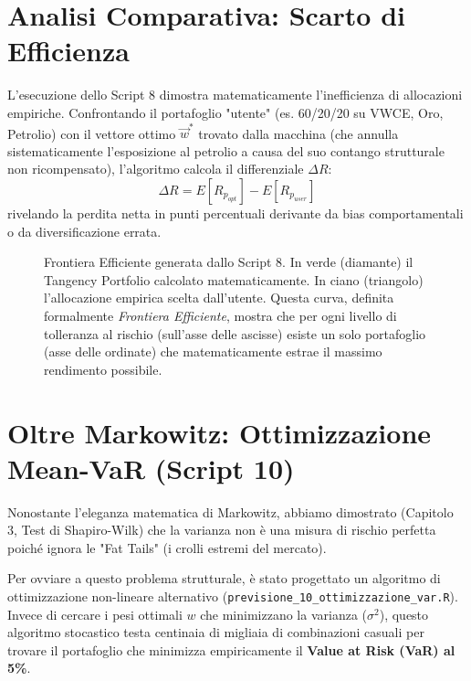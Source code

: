 \section{Analisi Comparativa: Scarto di Efficienza}
L'esecuzione dello Script 8 dimostra matematicamente l'inefficienza di allocazioni empiriche. Confrontando il portafoglio "utente" (es. 60/20/20 su VWCE, Oro, Petrolio) con il vettore ottimo $\vec{w}^*$ trovato dalla macchina (che annulla sistematicamente l'esposizione al petrolio a causa del suo contango strutturale non ricompensato), l'algoritmo calcola il differenziale $\Delta R$:
\begin{equation}
\Delta R = E[R_{p_{opt}}] - E[R_{p_{user}}]
\end{equation}
rivelando la perdita netta in punti percentuali derivante da bias comportamentali o da diversificazione errata.

\begin{figure}[H]
    \centering
    \vspace{6cm} %
    \caption{Frontiera Efficiente generata dallo Script 8. In verde (diamante) il Tangency Portfolio calcolato matematicamente. In ciano (triangolo) l'allocazione empirica scelta dall'utente. Questa curva, definita formalmente \emph{Frontiera Efficiente}, mostra che per ogni livello di tolleranza al rischio (sull'asse delle ascisse) esiste un solo portafoglio (asse delle ordinate) che matematicamente estrae il massimo rendimento possibile.}
    \label{fig:markowitz}
\end{figure}

\section{Oltre Markowitz: Ottimizzazione Mean-VaR (Script 10)}
Nonostante l'eleganza matematica di Markowitz, abbiamo dimostrato (Capitolo 3, Test di Shapiro-Wilk) che la varianza non è una misura di rischio perfetta poiché ignora le "Fat Tails" (i crolli estremi del mercato).

Per ovviare a questo problema strutturale, è stato progettato un algoritmo di ottimizzazione non-lineare alternativo (\texttt{previsione\_10\_ottimizzazione\_var.R}). Invece di cercare i pesi ottimali $w$ che minimizzano la varianza ($\sigma^2$), questo algoritmo stocastico testa centinaia di migliaia di combinazioni casuali per trovare il portafoglio che minimizza empiricamente il \textbf{Value at Risk (VaR) al 5\%}.


